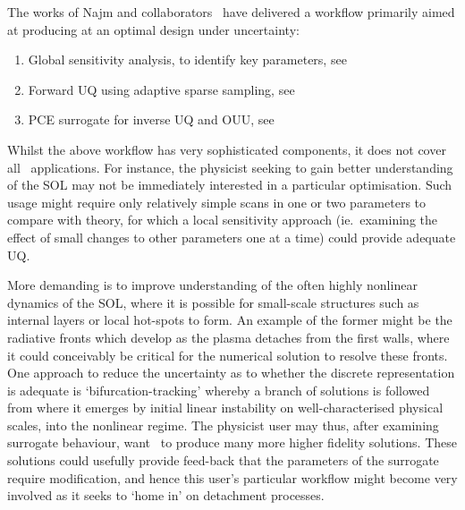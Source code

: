 The works of Najm and collaborators~\cite{Hu18Glob, Ge19Prog} have delivered a workflow 
primarily aimed at producing at an optimal design under uncertainty:
\begin{enumerate}
\item Global sensitivity analysis, to identify key parameters, see 
\item Forward UQ using adaptive sparse sampling, see 
\item PCE surrogate for inverse UQ and OUU, see 
\end{enumerate}

Whilst the above workflow has very sophisticated components, it does not cover all \nep\ applications.
For instance, the physicist seeking to gain better understanding of the SOL may not
be immediately interested in a particular optimisation. Such usage might require
only relatively simple scans in one or two parameters to compare with theory, for which
a local sensitivity approach (ie.\ examining the effect of small changes to other parameters
one at a time) could provide adequate UQ.

More demanding is to improve understanding of the often highly nonlinear
dynamics of the SOL, where it is possible for small-scale structures such as internal layers
or local hot-spots to form. An example of the former might be the radiative fronts
which develop as the plasma detaches from the first walls, where it could conceivably
be critical for the numerical solution to resolve these fronts. One approach to reduce
the uncertainty as to whether the discrete representation is adequate is `bifurcation-tracking'
whereby a branch of solutions is followed from where it emerges by initial linear 
instability on well-characterised physical scales, into the nonlinear regime.
The physicist user may thus, after examining surrogate behaviour, want \nep\ to produce
many more higher fidelity solutions. These solutions could usefully provide feed-back that
the parameters of the
surrogate require modification, and hence this user's particular workflow might become very involved
as it seeks to `home in' on detachment processes.

